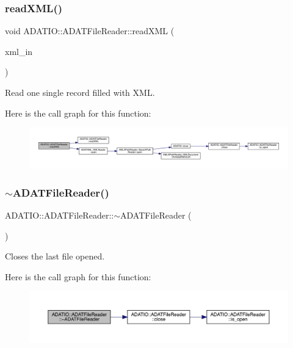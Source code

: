 \subsubsection{\texorpdfstring{readXML()}{readXML()}\hspace{0.1cm}{\footnotesize\ttfamily [2/2]}}
{\footnotesize\ttfamily void A\+D\+A\+T\+I\+O\+::\+A\+D\+A\+T\+File\+Reader\+::read\+X\+ML (\begin{DoxyParamCaption}\item[{\mbox{\hyperlink{classADATXML_1_1XMLReader}{X\+M\+L\+Reader}} \&}]{xml\+\_\+in }\end{DoxyParamCaption})\hspace{0.3cm}{\ttfamily [protected]}}



Read one single record filled with X\+ML. 

Here is the call graph for this function\+:
\nopagebreak
\begin{figure}[H]
\begin{center}
\leavevmode
\includegraphics[width=350pt]{db/de5/group__qio_ga9a1ac411577bd50e643f483119318893_cgraph}
\end{center}
\end{figure}
\mbox{\label{group__qio_ga54a5eea68d2a1c6f5b748f6ba75b7d22}} 
\subsubsection{\texorpdfstring{$\sim$ADATFileReader()}{~ADATFileReader()}}
{\footnotesize\ttfamily A\+D\+A\+T\+I\+O\+::\+A\+D\+A\+T\+File\+Reader\+::$\sim$\+A\+D\+A\+T\+File\+Reader (\begin{DoxyParamCaption}{ }\end{DoxyParamCaption})}



Closes the last file opened. 

Here is the call graph for this function\+:
\nopagebreak
\begin{figure}[H]
\begin{center}
\leavevmode
\includegraphics[width=350pt]{db/de5/group__qio_ga54a5eea68d2a1c6f5b748f6ba75b7d22_cgraph}
\end{center}
\end{figure}


